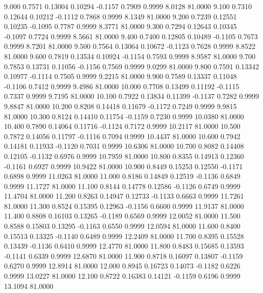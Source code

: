    9.000   0.7571   0.13004   0.10294  -0.1157   0.7909   0.9999   8.0128  81.0000
   9.100   0.7310   0.12644   0.10212  -0.1112   0.7868   0.9999   8.1349  81.0000
   9.200   0.7239   0.12551   0.10235  -0.1095   0.7787   0.9999   8.3771  81.0000
   9.300   0.7294   0.12643   0.10345  -0.1097   0.7724   0.9999   8.5661  81.0000
   9.400   0.7400   0.12805   0.10489  -0.1105   0.7673   0.9999   8.7201  81.0000
   9.500   0.7564   0.13064   0.10672  -0.1123   0.7628   0.9999   8.8522  81.0000
   9.600   0.7819   0.13534   0.10924  -0.1154   0.7593   0.9999   8.9587  81.0000
   9.700   0.7853   0.13731   0.11056  -0.1156   0.7569   0.9999   9.0299  81.0000
   9.800   0.7591   0.13342   0.10977  -0.1114   0.7505   0.9999   9.2215  81.0000
   9.900   0.7589   0.13337   0.11048  -0.1106   0.7412   0.9999   9.4986  81.0000
  10.000   0.7708   0.13499   0.11192  -0.1115   0.7337   0.9999   9.7195  81.0000
  10.100   0.7922   0.13834   0.11399  -0.1137   0.7282   0.9999   9.8847  81.0000
  10.200   0.8208   0.14418   0.11679  -0.1172   0.7249   0.9999   9.9815  81.0000
  10.300   0.8124   0.14410   0.11754  -0.1159   0.7230   0.9999  10.0380  81.0000
  10.400   0.7890   0.14064   0.11716  -0.1124   0.7172   0.9999  10.2117  81.0000
  10.500   0.7872   0.14056   0.11797  -0.1116   0.7094   0.9999  10.4437  81.0000
  10.600   0.7942   0.14181   0.11933  -0.1120   0.7031   0.9999  10.6306  81.0000
  10.700   0.8082   0.14408   0.12105  -0.1132   0.6976   0.9999  10.7959  81.0000
  10.800   0.8355   0.14913   0.12360  -0.1161   0.6927   0.9999  10.9422  81.0000
  10.900   0.8449   0.15253   0.12550  -0.1171   0.6898   0.9999  11.0263  81.0000
  11.000   0.8186   0.14849   0.12519  -0.1136   0.6849   0.9999  11.1727  81.0000
  11.100   0.8144   0.14778   0.12586  -0.1126   0.6749   0.9999  11.4704  81.0000
  11.200   0.8263   0.14947   0.12733  -0.1133   0.6663   0.9999  11.7261  81.0000
  11.300   0.8524   0.15395   0.12963  -0.1156   0.6600   0.9999  11.9137  81.0000
  11.400   0.8808   0.16103   0.13265  -0.1189   0.6569   0.9999  12.0052  81.0000
  11.500   0.8588   0.15803   0.13295  -0.1163   0.6550   0.9999  12.0594  81.0000
  11.600   0.8400   0.15513   0.13325  -0.1140   0.6489   0.9999  12.2409  81.0000
  11.700   0.8395   0.15528   0.13439  -0.1136   0.6410   0.9999  12.4770  81.0000
  11.800   0.8483   0.15685   0.13593  -0.1141   0.6339   0.9999  12.6870  81.0000
  11.900   0.8718   0.16097   0.13807  -0.1159   0.6270   0.9999  12.8914  81.0000
  12.000   0.8945   0.16723   0.14073  -0.1182   0.6226   0.9999  13.0227  81.0000
  12.100   0.8722   0.16383   0.14121  -0.1159   0.6196   0.9999  13.1094  81.0000
